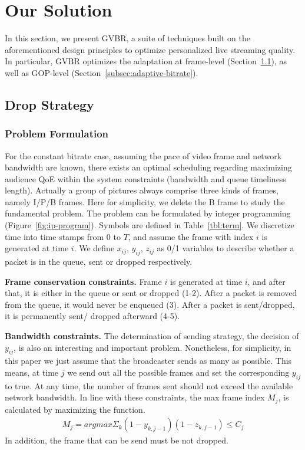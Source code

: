 \newcommand{\Mod}[1]{\text{ (mod } #1\text{)}}
\section{Our Solution}
In this section, we present GVBR, a suite of techniques built on the
aforementioned design principles to optimize personalized live streaming
quality.
In particular, GVBR optimizes the adaptation at frame-level
(Section~\ref{subsec:drop-strategy}), as well as GOP-level
(Section~\ref{subsec:adaptive-bitrate}).

\subsection{Drop Strategy}
\label{subsec:drop-strategy}
\subsubsection{Problem Formulation}


For the constant bitrate case, assuming the pace of video frame and network bandwidth are known, there exists an optimal scheduling regarding maximizing audience QoE within the system constraints (bandwidth and queue timeliness length). Actually a group of pictures always comprise three kinds of frames, namely I/P/B frames. Here for simplicity, we delete the B frame to study the fundamental problem. The problem can be formulated by integer programming (Figure~\ref{fig:ip-program}). Symbols are defined in Table~\ref{tbl:term}. We discretize time into time stamps from $0$ to $T$, and assume the frame with index $i$ is generated at time $i$. We define $x_{ij}$, $y_{ij}$, $z_{ij}$ as 0/1 variables to describe whether a packet is in the queue, sent or dropped respectively.

\textbf{Frame conservation constraints.}
Frame $i$ is generated at time $i$, and after that, it is either in the queue or sent or dropped (1-2).
After a packet is removed from the queue, it would never be enqueued (3).
After a packet is sent/dropped, it is permanently sent/ dropped afterward (4-5).

\textbf{Bandwidth constraints.}
The determination of sending strategy, the decision of $y_{ij}$, is also an interesting and important problem. Nonetheless, for simplicity, in this paper we just assume that the broadcaster sends as many as possible. This means, at time $j$ we send out all the possible frames and set the corresponding $y_{ij}$ to true. At any time, the number of frames sent should not exceed the available network bandwidth. In line with these constraints, the max frame index $M_{j}$, is calculated by maximizing the function.
\begin{align}
M_j = argmax \Sigma_k (1-y_{k,j-1})(1-z_{k,j-1}) \leq C_{j}
\end{align}
In addition, the frame that can be send must be not dropped.

